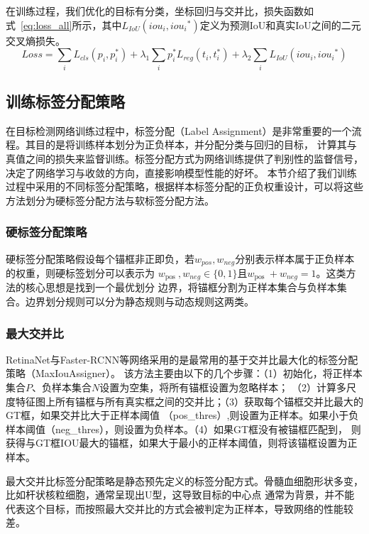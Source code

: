 在训练过程，我们优化的目标有分类，坐标回归与交并比，损失函数如式~\ref{eq:loss_all}所示，其中${{L_{IoU}}(io{u_i},io{u_i}^*)}$定义为预测IoU和真实IoU之间的二元交叉熵损失。
\begin{equation}   
  Loss = \sum\limits_i {{L_{cls}}} \left( {{p_i},p_i^*} \right) + {\lambda _1}\sum\limits_i {p_i^*} {L_{reg}}\left( {{t_i},t_i^*} \right) + {\lambda _2}\sum\limits_i {{L_{IoU}}(io{u_i},io{u_i}^*)} 
  \label{eq:loss_all} 
\end{equation}




\subsection{训练标签分配策略}
  在目标检测网络训练过程中，标签分配（Label Assignment）是非常重要的一个流程。其目的是将训练样本划分为正负样本，并分配分类与回归的目标，
  计算其与真值之间的损失来监督训练。标签分配方式为网络训练提供了判别性的监督信号，决定了网络学习与收敛的方向，直接影响模型性能的好坏。
  本节介绍了我们训练过程中采用的不同标签分配策略，根据样本标签分配的正负权重设计，可以将这些方法划分为硬标签分配方法与软标签分配方法。

\subsubsection{硬标签分配策略}
硬标签分配策略假设每个锚框非正即负，若$w_{pos}, w_{neg}$分别表示样本属于正负样本的权重，则硬标签划分可以表示为
$w_{\text {pos }}, w_{n e g} \in\{0,1\}$且$w_{\text {pos }} +  w_{n e g} = 1$。这类方法的核心思想是找到一个最优划分
边界，将锚框分割为正样本集合与负样本集合。边界划分规则可以分为静态规则与动态规则这两类。

\subsubsection{最大交并比}
RetinaNet与Faster-RCNN等网络采用的是最常用的基于交并比最大化的标签分配策略（MaxIouAssigner）。
该方法主要由以下的几个步骤：（1）初始化，将正样本集合$P$、负样本集合$N$设置为空集，将所有锚框设置为忽略样本；
（2）计算多尺度特征图上所有锚框与所有真实框之间的交并比；（3）获取每个锚框交并比最大的GT框，如果交并比大于正样本阈值
（pos\_thres）,则设置为正样本。如果小于负样本阈值（neg\_thres），则设置为负样本。（4）如果GT框没有被锚框匹配到，
则获得与GT框IOU最大的锚框，如果大于最小的正样本阈值，则将该锚框设置为正样本。

最大交并比标签分配策略是静态预先定义的标签分配方式。骨髓血细胞形状多变，比如杆状核粒细胞，通常呈现出U型，这导致目标的中心点
通常为背景，并不能代表这个目标，而按照最大交并比的方式会被判定为正样本，导致网络的性能较差。

